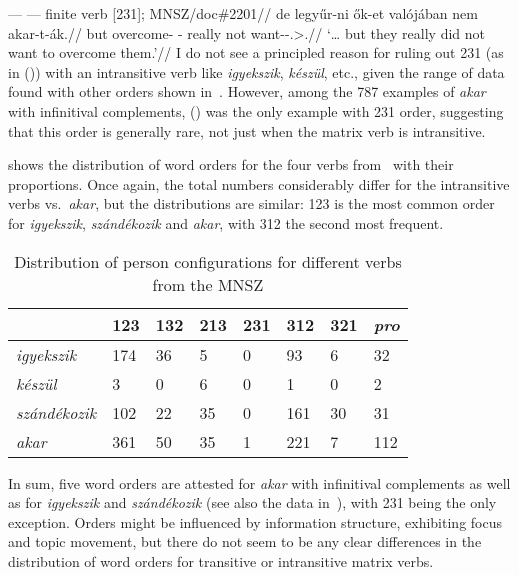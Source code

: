 \ex
    \begingl
    \glpreamble \Inf{} --- \Obj{} --- finite verb [231]; \gls{MNSZ}/doc\#2201//
        \gla 	\nogloss{\dots{}} de legyűr-ni ők-et valójában nem akar-t-ák.//
        \glb 	but overcome-\Inf{} \Tpl-\Acc{} really not want-\Pst-\Tpl.\Sbj{}>\Third.\Obj{}//
        \glft 	\enquote*{\dots{} but they really did not want to overcome them.}//
    \endgl
\xe
I do not see a principled reason for ruling out 231 (as in (\lastx)) with an
intransitive verb like \emph{igyekszik}, \emph{készül}, etc., given the range
of data found with other orders shown in~.
%
However, among the 787 examples of \emph{akar} with infinitival complements,
(\lastx) was the only example with 231 order, suggesting that this order is
generally rare, not just when the matrix verb is intransitive.

 shows the distribution of word orders for the four
verbs from~ with their proportions. Once again, the
total numbers considerably differ for the intransitive verbs vs.\ \emph{akar},
but the distributions are similar: 123 is the most common order for
\emph{igyekszik}, \emph{szándékozik} and \emph{akar}, with 312 the second most
frequent.

\begin{table}[htpb]
    \centering
    \begin{tabular}{llllllll}
    \toprule
        & 123 & 132 & 213 & 231 & 312 & 321 & \emph{pro} \\
    \midrule
    \emph{igyekszik} & 174 & 36 & 5 & 0 & 93 & 6 & 32\\
    \emph{készül} & 3 & 0 & 6 & 0 & 1 & 0 & 2 \\
    \emph{szándékozik} & 102 & 22 & 35 & 0 & 161 & 30 & 31 \\
    \midrule
    \emph{akar} & 361 & 50 & 35 & 1 & 221 & 7 & 112 \\
    \bottomrule
    \end{tabular}
    \caption{Distribution of person configurations for different verbs
    from the \gls{MNSZ}}\label{tb:mnsz-order-counts}
\end{table}

In sum, five word orders are attested for \emph{akar} with infinitival
complements as well as for \emph{igyekszik} and \emph{szándékozik} (see also
the data in~), with 231 being the only exception. Orders might
be influenced by information structure, exhibiting focus and topic movement,
but there do not seem to be any clear differences in the distribution of word
orders for transitive or intransitive matrix verbs.


